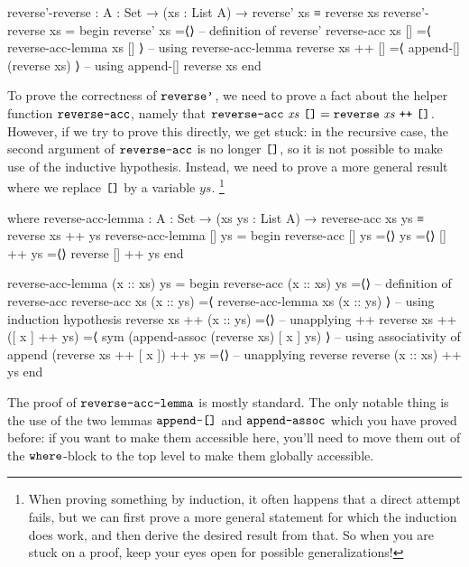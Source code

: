 \documentclass[a4paper,UKenglish]{tufte-handout}
\theoremstyle{definition}
\newcommand\var[1]{\mathit{#1}}
\newcommand\fun[1]{{\AgdaFunction{#1}}}
\newcommand\con[1]{{\AgdaInductiveConstructor{#1}}}
\newcommand\keyw[1]{{\AgdaKeyword{#1}}}
\newcommand\nil{\con{[]}}
\begin{document}
\begin{AgdaAlign}
\begin{code}[number]
reverse'-reverse : {A : Set} → (xs : List A) → reverse' xs ≡ reverse xs
reverse'-reverse xs =
  begin
    reverse' xs
  =⟨⟩                           -- definition of reverse'
    reverse-acc xs []
  =⟨ reverse-acc-lemma xs [] ⟩  -- using reverse-acc-lemma
    reverse xs ++ []
  =⟨ append-[] (reverse xs) ⟩   -- using append-[]
    reverse xs
  end
\end{code}
To prove the correctness of $\fun{reverse'}$, we need to prove a fact
about the helper function $\fun{reverse-acc}$, namely that
$\fun{reverse-acc}\ \var{xs}\ \nil = \fun{reverse}\ \var{xs}\
\fun{++}\ \nil$. However, if we try to prove this directly, we get
stuck: in the recursive case, the second argument of
$\fun{reverse-acc}$ is no longer $\nil$, so it is not possible to make
use of the inductive hypothesis. Instead, we need to prove a more
general result where we replace $\nil$ by a variable $\var{ys}$.%
\footnote{When proving something by induction, it often happens that a
direct attempt fails, but we can first prove a more general statement
for which the induction does work, and then derive the desired result
from that. So when you are stuck on a proof, keep your eyes open for
possible generalizations!  }
\begin{AgdaSuppressSpace}
\begin{code}[number]
  where
    reverse-acc-lemma : {A : Set} → (xs ys : List A)
      → reverse-acc xs ys ≡ reverse xs ++ ys
    reverse-acc-lemma [] ys =
      begin
        reverse-acc [] ys
      =⟨⟩
        ys
      =⟨⟩
        [] ++ ys
      =⟨⟩
        reverse [] ++ ys
      end
\end{code}
\begin{fullwidth}
\begin{code}[number]
    reverse-acc-lemma (x :: xs) ys =
      begin
        reverse-acc (x :: xs) ys
      =⟨⟩                                            -- definition of reverse-acc
        reverse-acc xs (x :: ys)
      =⟨ reverse-acc-lemma xs (x :: ys) ⟩            -- using induction hypothesis
        reverse xs ++ (x :: ys)
      =⟨⟩                                            -- unapplying ++
        reverse xs ++ ([ x ] ++ ys)
      =⟨ sym (append-assoc (reverse xs) [ x ] ys) ⟩  -- using associativity of append
        (reverse xs ++ [ x ]) ++ ys
      =⟨⟩                                            -- unapplying reverse
        reverse (x :: xs) ++ ys
      end
\end{code}
\end{fullwidth}
\end{AgdaSuppressSpace}
\end{AgdaAlign}
The proof of $\fun{reverse-acc-lemma}$ is mostly standard. The only
notable thing is the use of the two lemmas $\fun{append-[]}$ and
$\fun{append-assoc}$ which you have proved before: if you want to make
them accessible here, you'll need to move them out of the
$\keyw{where}$-block to the top level to make them globally
accessible.
\end{document}
